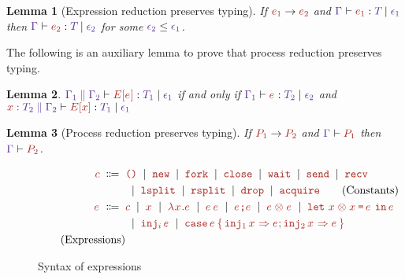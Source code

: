 \documentclass{article}
\newtheorem{lemma}{Lemma}
\begin{document}
\begin{lemma}[Expression reduction preserves typing]
  If $\E[1] \Reduces \E[2]$ and 
  $\HasType
      {\Ctx}
      {\E[1]}
      {\T}
      {\Eff[1]}$
  then 
  $\HasType
      {\Ctx}
      {\E[2]}
      {\T}
      {\Eff[2]}$
  for some $\Eff[2] \leq \Eff[1]$.
\end{lemma}

The following is an auxiliary lemma to prove that 
process reduction preserves typing.

\begin{lemma}
    $\HasType
      {\CtxExtUnord {\Ctx[1]}{\Ctx[2]}}
      {\EC[\E]}
      {\T[1]}
      {\Eff[1]}$ 
    if and only if
    $\HasType
      {\Ctx[1]}
      {\E}
      {\T[2]}
      {\Eff[2]}$
    and 
    $\HasType
      {\CtxExtUnord {\CtxVar x{\T[2]}}{\Ctx[2]}}
      {\EC[x]}
      {\T[1]}
      {\Eff[1]}$ 
\end{lemma}

\begin{lemma}[Process reduction preserves typing]
  If $\Proc[1] \Reduces \Proc[2]$ and 
  $\ProcHasType {\Ctx} {\Proc[1]}$
  then 
  $\ProcHasType {\Ctx} {\Proc[2]}$.
\end{lemma}


\begin{figure}
  \begin{align*}
    \C \grmeq
      & \CUnit
        \grmor \CNew
        \grmor \CFork
        \grmor \CTerm 
        \grmor \CWait
        \grmor \CSend
        \grmor \CRecv
    \\&
    \grmor \CSplit \grmor \CSSplit
    \grmor \CDrop \grmor \CAcq
        \tag{Constants} \\
    \E \grmeq
      & \C \grmor \EVar \grmor \EAbs\EVar\E \grmor \EApp\E\E 
        \grmor \ESeq\E\E
        \grmor \EPair\E\E
        \grmor \ELetPair{\EVar}{\EVar}{\E}{\E} \\
      &  \grmor \EInj i \E 
        \grmor\ECase\E{\EVar}{\E}{\EVar}{\E} \\
        \tag{Expressions}
  \end{align*}
  \caption{Syntax of expressions}
  \label{fig:syntax-expressions}
\end{figure}

\end{document}
